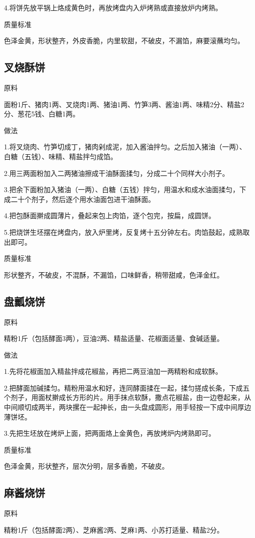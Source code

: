 \documentclass{ctexbook}
\begin{document}
4.将饼先放平锅上烙成黄色时，再放烤盘内入炉烤熟或直接放炉内烤熟。

质量标准

色泽金黄，形状整齐，外皮香脆，内里软甜，不破皮，不漏馅，麻要滚蘸均匀。
\subsection{叉烧酥饼}
原料

面粉1斤、猪肉1两、叉烧肉1两、猪油1两、竹笋3两、酱油1两、味精2分、精盐2分、葱花5钱、白糖1两。

做法

1.将叉烧肉、竹笋切成丁，猪肉剁成泥，加入酱油拌匀。之后加入猪油（一两）、白糖（五钱）、味精、精盐拌匀成馅。

2.用三两面粉加入二两猪油擦成干油酥面揉匀，分成二十个同样大小剂子。

3.把余下面粉加入猪油（一两）、白糖（五钱）拌匀，用温水和成水油面揉匀，下成二十个剂子，然后逐个用水油面包进干油酥面。

4.把包酥面擀成圆薄片，叠起来包上肉馅，逐个包完，按扁，成圆饼。

5.把烧饼生坯摆在烤盘内，放入炉里烤，反复烤十五分钟左右。肉馅鼓起，成熟取出即可。

质量标准

形状整齐，不破皮，不混酥，不漏馅，口味鲜香，稍带甜咸，色泽金红。
\subsection{盘瓤烧饼}
原料

精粉1斤（包括酵面3两），豆油2两、精盐适量、花椒面适量、食碱适量。

做法

1.先将花椒面加入精盐拌成花椒盐，再把二两豆油加一两精粉和成软酥。

2.把酵面加碱揉匀。精粉用温水和好，连同酵面揉在一起，揉匀搓成长条，下成五个剂子，用面杖擀成长方形的片。用手抹点软酥，撒点花椒盐，由一边卷起来，从中间顺切成两半，两块摞在一起抻长，由一头盘成圆形，用手轻按一下成中间厚边薄饼坯。

3.先把生坯放在烤炉上面，把两面烙上金黄色，再放烤炉内烤熟即可。

质量标准

色泽金黄，形状整齐，层次分明，层多香脆，不破皮。
\subsection{麻酱烧饼}
原料

精粉1斤（包括酵面2两）、芝麻酱2两、芝麻1两、小苏打适量、精盐2分。
\end{document}
